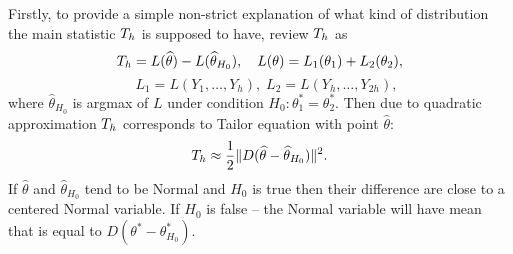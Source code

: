 Firstly, to provide a simple non-strict explanation of what kind of distribution the main statistic  $T_h$ is supposed to have, review  $T_h$ as
\[
T_h = L(\widehat{\theta}) -  L(\widehat{\theta}_{H_0}), 
\quad L(\theta) = L_1(\theta_1) + L_2(\theta_2), 
\]
\[
\quad L_1 = L(Y_1,\ldots,Y_h), \; L_2 = L(Y_h,\ldots,Y_{2h}), 
\]
where $\widehat{\theta}_{H_0}$ is argmax of $L$ under condition $H_0: \theta_1^* = \theta_2^*$. Then due to quadratic approximation $T_h$  corresponds to Tailor equation with point $\widehat{\theta}$:
\[
T_h \approx \frac{1}{2} \Vert D(\widehat{\theta} - \widehat{\theta}_{H_0})  \Vert^2.
\]   
If $\widehat{\theta}$ and $\widehat{\theta}_{H_0}$ tend to be Normal and $H_0$ is true then their difference are close to a centered Normal variable. If $H_0$ is false -- the Normal variable will have mean that  is equal to $D(\theta^* - \theta_{H_0}^*)$. 

